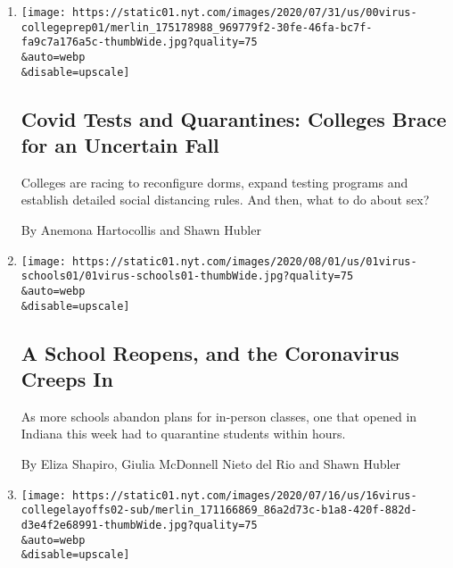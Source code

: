 \begin{enumerate}
\def\labelenumi{\arabic{enumi}.}
\item
  \href{/2020/08/02/us/covid-college-reopening.html}{}

  \texttt{[image: https://static01.nyt.com/images/2020/07/31/us/00virus-collegeprep01/merlin\_175178988\_969779f2-30fe-46fa-bc7f-fa9c7a176a5c-thumbWide.jpg?quality=75\\\&auto=webp\\\&disable=upscale]}

  \hypertarget{covid-tests-and-quarantines-colleges-brace-for-an-uncertain-fall}{%
  \subsection{Covid Tests and Quarantines: Colleges Brace for an
  Uncertain
  Fall}\label{covid-tests-and-quarantines-colleges-brace-for-an-uncertain-fall}}

  Colleges are racing to reconfigure dorms, expand testing programs and
  establish detailed social distancing rules. And then, what to do about
  sex?

  By Anemona Hartocollis and Shawn Hubler
\item
  \href{/2020/08/01/us/schools-reopening-indiana-coronavirus.html}{}

  \texttt{[image: https://static01.nyt.com/images/2020/08/01/us/01virus-schools01/01virus-schools01-thumbWide.jpg?quality=75\\\&auto=webp\\\&disable=upscale]}

  \hypertarget{a-school-reopens-and-the-coronavirus-creeps-in}{%
  \subsection{A School Reopens, and the Coronavirus Creeps
  In}\label{a-school-reopens-and-the-coronavirus-creeps-in}}

  As more schools abandon plans for in-person classes, one that opened
  in Indiana this week had to quarantine students within hours.

  By Eliza Shapiro, Giulia McDonnell Nieto del Rio and Shawn Hubler
\item
  \href{/2020/07/16/us/coronavirus-college-faculty-layoffs.html}{}

  \texttt{[image: https://static01.nyt.com/images/2020/07/16/us/16virus-collegelayoffs02-sub/merlin\_171166869\_86a2d73c-b1a8-420f-882d-d3e4f2e68991-thumbWide.jpg?quality=75\\\&auto=webp\\\&disable=upscale]}

  \hypertarget{as-the-virus-deepens-financial-trouble-colleges-turn-to-layoffs}{%
}
\end{enumerate}
